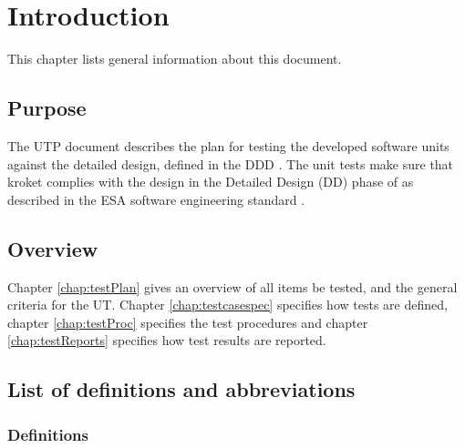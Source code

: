 \chapter{Introduction}\label{chap:intro}
This chapter lists general information about this document.

\section{Purpose}
The UTP document describes the plan for testing the developed software units against the
detailed design, deﬁned in the DDD \cite{DDD}. The unit tests make sure that kroket complies
with the design in the Detailed Design (DD) phase of \projectname as described in
the ESA software engineering standard \cite{esa}.

\section{Overview}
\label{sec:overview}

Chapter \ref{chap:testPlan} gives an overview of all items be tested, and the general criteria for the UT. 
Chapter \ref{chap:testcasespec} speciﬁes how tests are deﬁned, chapter \ref{chap:testProc} speciﬁes the test procedures and chapter \ref{chap:testReports} speciﬁes how test results are reported.


\section{List of definitions and abbreviations}
\label{sec:listofdef}


\subsection{Definitions}
\label{subsec:def}

